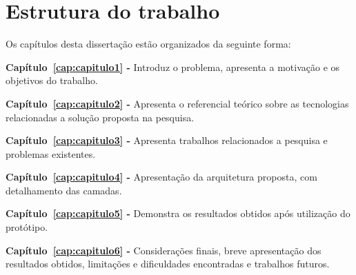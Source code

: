 \section{Estrutura do trabalho}

Os capítulos desta dissertação estão organizados da seguinte forma:

\textbf{Capítulo~\ref{cap:capitulo1} -} Introduz o problema, apresenta a motivação e os objetivos do trabalho.

\textbf{Capítulo~\ref{cap:capitulo2} -} Apresenta o referencial teórico sobre as tecnologias relacionadas a solução proposta na pesquisa.

\textbf{Capítulo~\ref{cap:capitulo3} -} Apresenta trabalhos relacionados a pesquisa e problemas existentes.

\textbf{Capítulo~\ref{cap:capitulo4} -} Apresentação da arquitetura proposta, com detalhamento das camadas.

\textbf{Capítulo~\ref{cap:capitulo5} -} Demonstra os resultados obtidos após utilização do protótipo.

\textbf{Capítulo~\ref{cap:capitulo6} -} Considerações finais, breve apresentação dos resultados obtidos, limitações e dificuldades encontradas e trabalhos futuros. 

